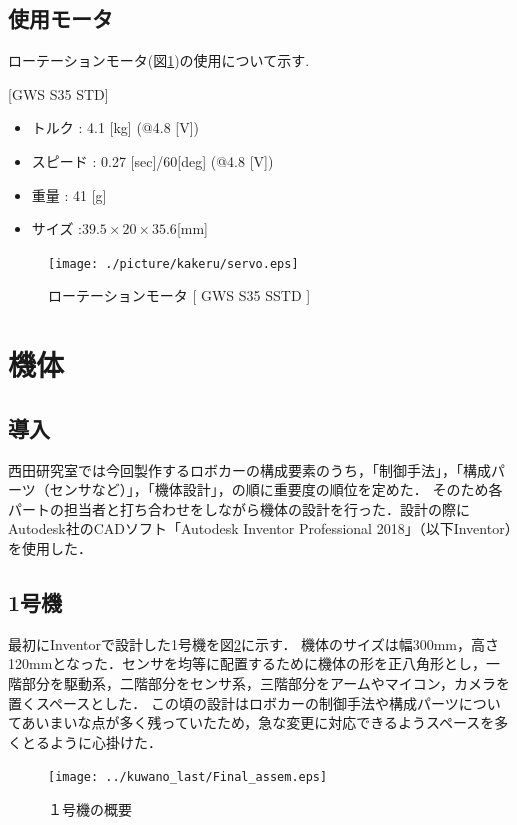 \documentclass[11pt,a4]{jsarticle}
\begin{document}
\newpage
\subsection{使用モータ}
ローテーションモータ(図\ref{servo})の使用について示す.

[GWS S35 STD]
\begin{itemize}
 \item トルク        : 4.1 [kg] (@4.8 [V])
 \item スピード      : 0.27 [sec]/60[deg] (@4.8 [V])
 \item 重量          : 41 [g]
 \item サイズ        :$39.5 \times 20 \times 35.6$[mm]
\end{itemize}

\begin{figure}[h]
  \centering
    \texttt{[image: ./picture/kakeru/servo.eps]}
    \caption{ローテーションモータ [ GWS S35 SSTD ]}
  \label{servo}
\end{figure}

\newpage

\section{機体}

\subsection{導入}
西田研究室では今回製作するロボカーの構成要素のうち，「制御手法」，「構成パーツ（センサなど）」，「機体設計」，の順に重要度の順位を定めた．
そのため各パートの担当者と打ち合わせをしながら機体の設計を行った．設計の際にAutodesk社のCADソフト「Autodesk Inventor Professional 2018」（以下Inventor）を使用した．

\subsection{1号機}
最初にInventorで設計した1号機を図\ref{assem}に示す．
機体のサイズは幅300mm，高さ120mmとなった．センサを均等に配置するために機体の形を正八角形とし，一階部分を駆動系，二階部分をセンサ系，三階部分をアームやマイコン，カメラを置くスペースとした．
この頃の設計はロボカーの制御手法や構成パーツについてあいまいな点が多く残っていたため，急な変更に対応できるようスペースを多くとるように心掛けた．

\begin{figure}[h]
\begin{center}
  \texttt{[image: ../kuwano\_last/Final\_assem.eps]}
\end{center}
\caption{１号機の概要}
\label{assem}
\end{figure}
\end{document}

